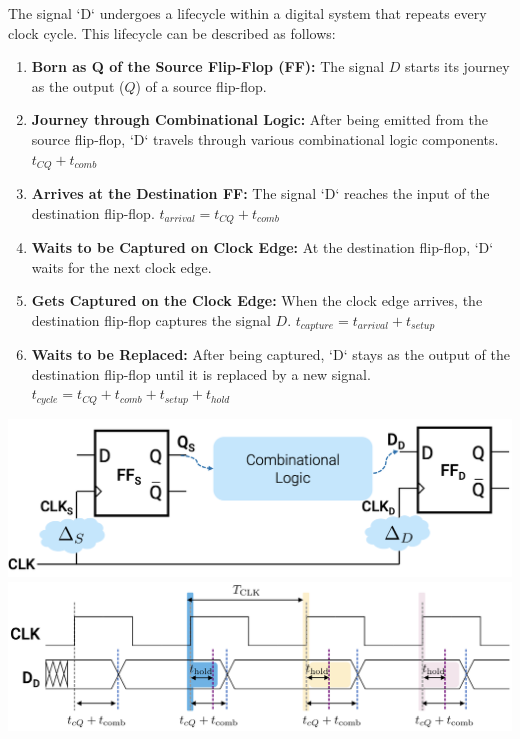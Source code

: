 \documentclass[12pt,openany]{book}
\begin{document}
The signal `D` undergoes a lifecycle within a digital system that repeats every clock cycle. This lifecycle can be described as follows:
\newline
\vspace*{10px}
\hspace*{-25px}
\begin{minipage}{0.5\textwidth}
	\begin{enumerate}
	    \item \small \textbf{Born as Q of the Source Flip-Flop (FF):} The signal $D$ starts its journey as the output ($Q$) of a source flip-flop.\\
		\item \textbf{Journey through Combinational Logic:} After being emitted from the source flip-flop, `D` travels through various combinational logic components. $ t_{CQ} + t_{comb}$ \\
	    \item \textbf{Arrives at the Destination FF:} The signal `D` reaches the input of the destination flip-flop. $ t_{arrival} = t_{CQ} + t_{comb}$ \\
	    \item \textbf{Waits to be Captured on Clock Edge:} At the destination flip-flop, `D` waits for the next clock edge.\\
		\item \textbf{Gets Captured on the Clock Edge:} When the clock edge arrives, the destination flip-flop captures the signal $D$.  $ t_{capture} = t_{arrival} + t_{setup}$ \\
	    \item \textbf{Waits to be Replaced:} After being captured, `D` stays as the output of the destination flip-flop until it is replaced by a new signal.  $ t_{cycle} = t_{CQ} + t_{comb} + t_{setup} + t_{hold}$ \\
	\end{enumerate}
\end{minipage}
\hfill
\begin{minipage}{0.5\textwidth}
	\includegraphics[width=1.2\textwidth]{circuits/15.5.png}
	\includegraphics[width=1.2\textwidth]{circuits/15.4.png}
\end{minipage}
\end{document}
